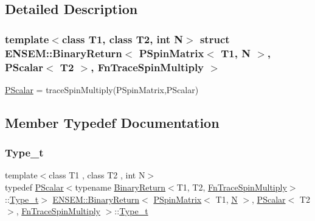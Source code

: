 \subsection{Detailed Description}
\subsubsection*{template$<$class T1, class T2, int N$>$\newline
struct E\+N\+S\+E\+M\+::\+Binary\+Return$<$ P\+Spin\+Matrix$<$ T1, N $>$, P\+Scalar$<$ T2 $>$, Fn\+Trace\+Spin\+Multiply $>$}

\mbox{\hyperlink{classENSEM_1_1PScalar}{P\+Scalar}} = trace\+Spin\+Multiply(\+P\+Spin\+Matrix,\+P\+Scalar) 

\subsection{Member Typedef Documentation}
\mbox{\label{structENSEM_1_1BinaryReturn_3_01PSpinMatrix_3_01T1_00_01N_01_4_00_01PScalar_3_01T2_01_4_00_01FnTraceSpinMultiply_01_4_ad894a0e2c8a84ee15a5bb11d76eba14d}} 
\subsubsection{\texorpdfstring{Type\_t}{Type\_t}\hspace{0.1cm}{\footnotesize\ttfamily [1/2]}}
{\footnotesize\ttfamily template$<$class T1 , class T2 , int N$>$ \\
typedef \mbox{\hyperlink{classENSEM_1_1PScalar}{P\+Scalar}}$<$typename \mbox{\hyperlink{structENSEM_1_1BinaryReturn}{Binary\+Return}}$<$T1, T2, \mbox{\hyperlink{structENSEM_1_1FnTraceSpinMultiply}{Fn\+Trace\+Spin\+Multiply}}$>$\+::\mbox{\hyperlink{structENSEM_1_1BinaryReturn_3_01PSpinMatrix_3_01T1_00_01N_01_4_00_01PScalar_3_01T2_01_4_00_01FnTraceSpinMultiply_01_4_ad894a0e2c8a84ee15a5bb11d76eba14d}{Type\+\_\+t}}$>$ \mbox{\hyperlink{structENSEM_1_1BinaryReturn}{E\+N\+S\+E\+M\+::\+Binary\+Return}}$<$ \mbox{\hyperlink{classENSEM_1_1PSpinMatrix}{P\+Spin\+Matrix}}$<$ T1, \mbox{\hyperlink{operator__name__util_8cc_a7722c8ecbb62d99aee7ce68b1752f337}{N}} $>$, \mbox{\hyperlink{classENSEM_1_1PScalar}{P\+Scalar}}$<$ T2 $>$, \mbox{\hyperlink{structENSEM_1_1FnTraceSpinMultiply}{Fn\+Trace\+Spin\+Multiply}} $>$\+::\mbox{\hyperlink{structENSEM_1_1BinaryReturn_3_01PSpinMatrix_3_01T1_00_01N_01_4_00_01PScalar_3_01T2_01_4_00_01FnTraceSpinMultiply_01_4_ad894a0e2c8a84ee15a5bb11d76eba14d}{Type\+\_\+t}}}

